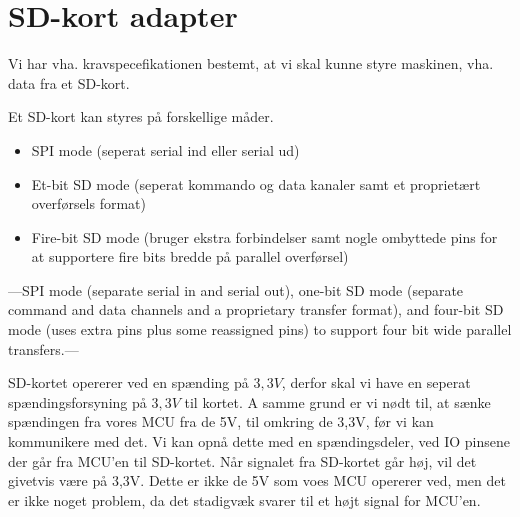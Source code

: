 


\section{SD-kort adapter}
Vi har vha. kravspecefikationen bestemt, at vi skal kunne styre
maskinen, vha. data fra et SD-kort.

Et SD-kort kan styres på forskellige måder. 

\begin{itemize}
\item{SPI mode (seperat serial ind eller serial ud)}
\item{Et-bit SD mode (seperat kommando og data kanaler samt et
    proprietært overførsels format)}
\item{Fire-bit SD mode (bruger ekstra forbindelser samt nogle
    ombyttede pins for at supportere fire bits bredde på parallel
    overførsel)}
\end{itemize}

---SPI mode (separate serial in and serial out), one-bit SD mode
(separate command and data channels and a proprietary transfer
format), and four-bit SD mode (uses extra pins plus some reassigned
pins) to support four bit wide parallel transfers.---


SD-kortet opererer ved en spænding på $3,3V$, derfor skal vi have en
seperat spændingsforsyning på $3,3V$ til kortet. A samme grund er vi
nødt til, at sænke spændingen fra vores MCU fra de 5V, til omkring de
3,3V, før vi kan kommunikere med det. Vi kan opnå dette med en
spændingsdeler, ved IO pinsene der går fra MCU'en til SD-kortet. Når
signalet fra SD-kortet går høj, vil det givetvis være på 3,3V. Dette
er ikke de 5V som voes MCU opererer ved, men det er ikke noget
problem, da det stadigvæk svarer til et højt signal for MCU'en.


